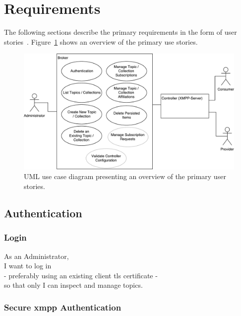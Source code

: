 
\section{Requirements}\label{sec:requirements}

The following sections describe the primary requirements in the form of user stories~\cite{agile-alliance-user-stories}.
Figure~\ref{fig:requirements-overview} shows an overview of the primary use stories.

\begin{figure}[h]
    \centering
    \includegraphics[width=1\linewidth]{resources/requirements_overview}
    \caption[Use case diagram]{UML use case diagram presenting an overview of the primary user stories.}
    \label{fig:requirements-overview}
\end{figure}

\subsection{Authentication}\label{sec:authentication}
\subsubsection{Login}

As an Administrator,\\
I want to log in\\
- preferably using an existing client \gls{tls} certificate - \\
so that only I can inspect and manage topics.\\

\subsubsection{Secure \gls{xmpp} Authentication}

